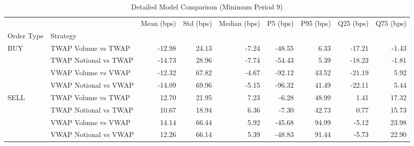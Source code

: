 \begin{table}
\caption{Detailed Model Comparison (Minimum Period 9)}
\label{tab:detailed_min_period_9}
\begin{tabular}{l|l|rrrrrrr}
\toprule
 &  & Mean (bps) & Std (bps) & Median (bps) & P5 (bps) & P95 (bps) & Q25 (bps) & Q75 (bps) \\
Order Type & Strategy &  &  &  &  &  &  &  \\
\midrule
\multirow[t]{4}{*}{BUY} & TWAP Volume vs TWAP & -12.98 & 24.13 & -7.24 & -48.55 & 6.33 & -17.21 & -1.43 \\
 & TWAP Notional vs TWAP & -14.73 & 28.96 & -7.74 & -54.43 & 5.39 & -18.23 & -1.81 \\
 & VWAP Volume vs VWAP & -12.32 & 67.82 & -4.67 & -92.12 & 43.52 & -21.19 & 5.92 \\
 & VWAP Notional vs VWAP & -14.09 & 69.96 & -5.15 & -96.32 & 41.49 & -22.11 & 5.44 \\
\cline{1-9}
\multirow[t]{4}{*}{SELL} & TWAP Volume vs TWAP & 12.70 & 21.95 & 7.23 & -6.28 & 48.99 & 1.41 & 17.32 \\
 & TWAP Notional vs TWAP & 10.67 & 18.94 & 6.36 & -7.30 & 42.73 & 0.77 & 15.73 \\
 & VWAP Volume vs VWAP & 14.14 & 66.44 & 5.92 & -45.68 & 94.99 & -5.12 & 23.98 \\
 & VWAP Notional vs VWAP & 12.26 & 66.14 & 5.39 & -48.83 & 91.44 & -5.73 & 22.90 \\
\cline{1-9}
\bottomrule
\end{tabular}
\end{table}
